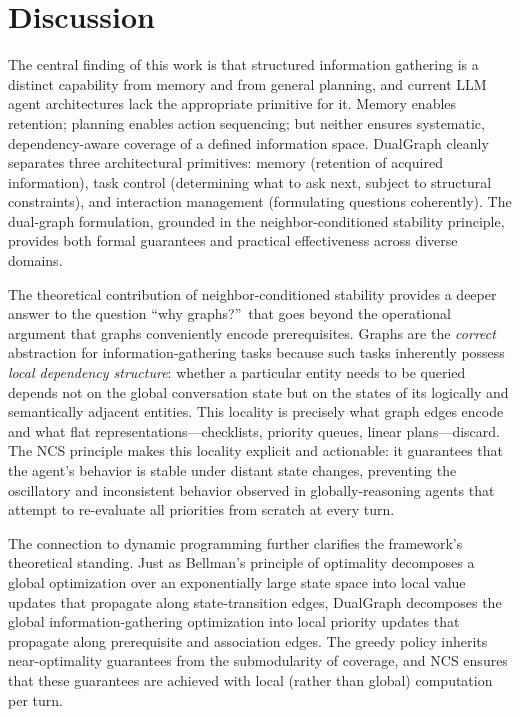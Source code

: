 \documentclass[11pt,a4paper]{article}
\begin{document}
\section{Discussion}
\label{sec:discussion}

The central finding of this work is that structured information gathering
is a distinct capability from memory and from general planning, and current
LLM agent architectures lack the appropriate primitive for it. Memory
enables retention; planning enables action sequencing; but neither ensures
systematic, dependency-aware coverage of a defined information space.
DualGraph cleanly separates three architectural primitives: memory
(retention of acquired information), task control (determining what to
ask next, subject to structural constraints), and interaction management
(formulating questions coherently). The dual-graph formulation, grounded
in the neighbor-conditioned stability principle, provides both formal
guarantees and practical effectiveness across diverse domains.

The theoretical contribution of neighbor-conditioned stability provides a
deeper answer to the question ``why graphs?''\ that goes beyond the
operational argument that graphs conveniently encode prerequisites. Graphs
are the \emph{correct} abstraction for information-gathering tasks because
such tasks inherently possess \emph{local dependency structure}: whether a
particular entity needs to be queried depends not on the global conversation
state but on the states of its logically and semantically adjacent entities.
This locality is precisely what graph edges encode and what flat
representations---checklists, priority queues, linear plans---discard. The
NCS principle makes this locality explicit and actionable: it guarantees
that the agent's behavior is stable under distant state changes, preventing
the oscillatory and inconsistent behavior observed in globally-reasoning
agents that attempt to re-evaluate all priorities from scratch at every turn.

The connection to dynamic programming further clarifies the framework's
theoretical standing. Just as Bellman's principle of optimality decomposes
a global optimization over an exponentially large state space into local
value updates that propagate along state-transition edges, DualGraph
decomposes the global information-gathering optimization into local
priority updates that propagate along prerequisite and association edges.
The greedy policy inherits near-optimality guarantees from the submodularity
of coverage, and NCS ensures that these guarantees are achieved with local
(rather than global) computation per turn.
\end{document}

